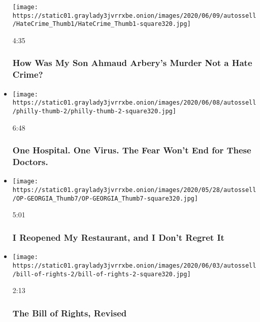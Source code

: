 \begin{itemize}
  \texttt{[image: https://static01.graylady3jvrrxbe.onion/images/2020/06/09/autossell/HateCrime\_Thumb1/HateCrime\_Thumb1-square320.jpg]}

  4:35

  \hypertarget{how-was-my-son-ahmaud-arberys-murder-not-a-hate-crime}{%
  \subsubsection{How Was My Son Ahmaud Arbery's Murder Not a Hate
  Crime?}\label{how-was-my-son-ahmaud-arberys-murder-not-a-hate-crime}}
\item
  \href{https://www.nytimes3xbfgragh.onion/video/opinion/100000007179767/coronavirus-hospital-philadelphia.html?action=click\&module=video-series-bar\&region=header\&pgtype=Article\&playlistId=video/opinion}{}

  \texttt{[image: https://static01.graylady3jvrrxbe.onion/images/2020/06/08/autossell/philly-thumb-2/philly-thumb-2-square320.jpg]}

  6:48

  \hypertarget{one-hospital-one-virus-the-fear-wont-end-for-these-doctors}{%
  \subsubsection{One Hospital. One Virus. The Fear Won't End for These
  Doctors.}\label{one-hospital-one-virus-the-fear-wont-end-for-these-doctors}}
\item
  \href{https://www.nytimes3xbfgragh.onion/video/opinion/100000007161418/coronavirus-georgia-restaurant-reopening.html?action=click\&module=video-series-bar\&region=header\&pgtype=Article\&playlistId=video/opinion}{}

  \texttt{[image: https://static01.graylady3jvrrxbe.onion/images/2020/05/28/autossell/OP-GEORGIA\_Thumb7/OP-GEORGIA\_Thumb7-square320.jpg]}

  5:01

  \hypertarget{i-reopened-my-restaurant-and-i-dont-regret-it}{%
  \subsubsection{I Reopened My Restaurant, and I Don't Regret
  It}\label{i-reopened-my-restaurant-and-i-dont-regret-it}}
\item
  \href{https://www.nytimes3xbfgragh.onion/video/opinion/100000007171122/protests-constitutional-rights.html?action=click\&module=video-series-bar\&region=header\&pgtype=Article\&playlistId=video/opinion}{}

  \texttt{[image: https://static01.graylady3jvrrxbe.onion/images/2020/06/03/autossell/bill-of-rights-2/bill-of-rights-2-square320.jpg]}

  2:13

  \hypertarget{the-bill-of-rights-revised}{%
  \subsubsection{The Bill of Rights,
  Revised}\label{the-bill-of-rights-revised}}
\end{itemize}

